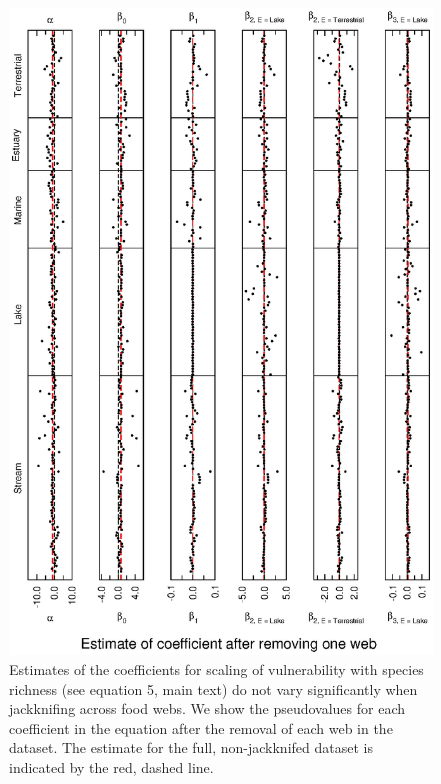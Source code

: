 \documentclass[12pt]{article}
\begin{document}
    \begin{figure}[!h]
    \centerline{\includegraphics*[height=.75\textheight]{Figures/Jackknife/Vul_web.eps}}
    \caption{Estimates of the coefficients for scaling of vulnerability with species richness
    (see equation 5, main text) do not vary significantly
    when jackknifing across food webs. We show the pseudovalues for each coefficient
    in the equation after the removal of each web in the dataset.  The estimate for the full, non-jackknifed 
    dataset is indicated by the red, dashed line.}
    \label{Vul_web}
    \end{figure}

\newpage
\end{document}
